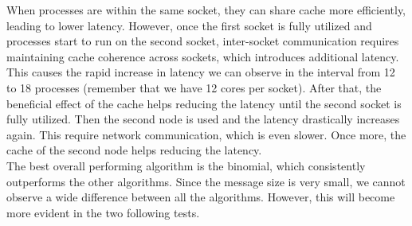     When processes are within the same socket, they can share cache more
    efficiently, leading to lower latency. However, once the first socket
    is fully utilized and processes start to run on the second socket,
    inter-socket communication requires maintaining cache coherence
    across sockets, which introduces additional latency. This causes
    the rapid increase in latency we can observe in the interval from
    12 to 18 processes (remember that we have 12 cores per socket).
    After that, the beneficial effect of the cache helps reducing the
    latency until the second socket is fully utilized. Then the second
    node is used and the latency drastically increases again. This
    require network communication, which is even slower.
    Once more, the cache of the second node helps reducing the latency. \\
    The best overall performing algorithm is the binomial, which 
    consistently outperforms the other algorithms. Since the message
    size is very small, we cannot observe a wide difference between
    all the algorithms. However, this will become more evident in the
    two following tests.
    
